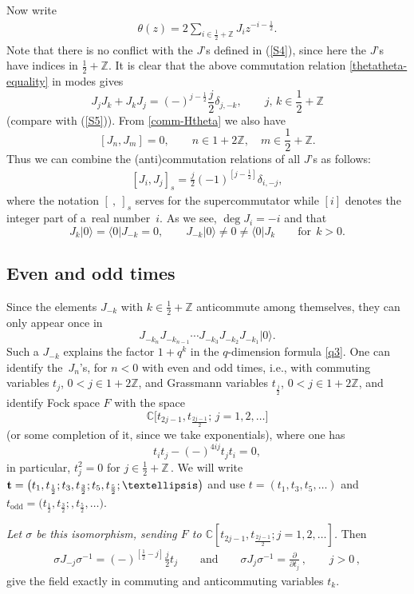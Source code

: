 \documentclass[11pt]{article}
\numberwithin{equation}{section}
\begin{document}
Now write
\begin{gather}\label{theta(z)}
\theta(z)=2\sum_{i\in\frac{1}{2}+\mathbb{Z}}
J_iz^{-i-\frac{1}{2}} .
\end{gather}
Note that there is no conf\/lict with the $J$'s def\/ined in (\ref{S4}), since here the $J$'s
have indices in $\frac{1}{2}+\mathbb{Z}$.
It is clear that the above commutation
relation \eqref{thetatheta-equality} in modes gives
\[
J_jJ_k+J_kJ_j=(-)^{j-\frac{1}{2}}\frac{j}2 \delta_{j,-k},\qquad j,\,k\in \frac{1}{2}+\mathbb{Z}
\]
(compare with (\ref{S5})). From \eqref{comm-Htheta} we also have
\[
[J_n, J_m]=0 ,\qquad n\in 1+2\mathbb{Z},\quad  m\in \frac{1}{2}+\mathbb{Z} .
\]
Thus we can combine the (anti)commutation relations of all $J$'s as follows:
 \begin{gather}\label{supercurrent}
[J_i, J_j]_s = \frac{j}{2}(-1)^{[j-\frac 12]}\delta_{i,-j} ,
 \end{gather}
where the notation $[\ {,}\ ]_s$ serves for the supercommutator while
$[i]$ denotes the integer part of a~real number~$i$. As we see,
$\deg J_i=-i$
 and that
\[
J_k|0\rangle=\langle 0|J_{-k}=0,\qquad
J_{-k}|0\rangle\ne 0\ne\langle 0|J_{k} \qquad\mbox{for}\ \ k>0 .
\]

\subsection{Even and odd times} \label{Even and odd times}
Since the elements $J_{-k}$ with $k\in \frac{1}{2}+\mathbb{Z}$
anticommute among themselves, they can only
appear once in
\[
J_{-k_n}J_{-k_{n-1}}\cdots J_{-k_3}J_{-k_2}J_{-k_1}|0\rangle.
\]
Such a $J_{-k}$ explains the factor $1+q^k$ in the
$q$-dimension formula \eqref{q3}. One can identify the~$J_n$'s, for $n<0$ with even and odd times, i.e., with  commuting
variables $t_j$, $0<j\in 1+2\mathbb{Z}$, and Grassmann variables $t_{\frac{j}2}$, $0<j\in
1+2\mathbb{Z}$, and identify Fock space $F$ with the space
\[
\mathbb{C}\big[t_{2j-1},t_{\frac{2j-1}2};\, j=1,2,\ldots \big]
\]
(or some completion of it, since we take exponentials),
where one has
\[
t_it_j-(-)^{4ij}t_jt_i=0 ,
\]
in particular, $t_j^2=0$ for $j\in \frac12+\mathbb{Z}$\,.
We will write ${\bf t}=\bigl(t_1,t_{\frac 12};t_3,t_{\frac 32};t_5,t_{\frac
52};\dots \bigr)$ and use $t=\left(t_1,t_3,t_5,\dots \right)$ and
$t_\mathrm{odd}=\bigl(t_{\frac 12},t_{\frac 32};,t_{\frac
52},\dots \bigr)$.


{\it Let $\sigma$ be this isomorphism,
sending $F$ to $\mathbb{C}[t_{2j-1},t_{\frac{2j-1}2}; j=1,2,\ldots]$.}
Then
\begin{gather}\label{theta-xi}
\sigma J_{-j}\sigma^{-1}=(-)^{[\frac{1}{2}-j]}\frac{j}2t_j\qquad\mbox{and}\qquad
\sigma J_j\sigma^{-1}=\frac{\partial}{\partial t_j}\,,\qquad
j>0\,,
\end{gather}
give the f\/ield exactly in commuting and anticommuting variables
$t_k$.
\end{document}
